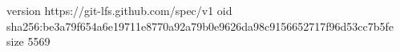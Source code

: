 version https://git-lfs.github.com/spec/v1
oid sha256:be3a79f654a6e19711e8770a92a79b0e9626da98c9156652717f96d53cc7b5fe
size 5569
